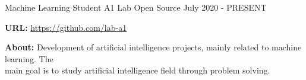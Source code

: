 
\begin{cventries}

	\cventry
	{Machine Learning Student} %
	{A1 Lab} %
	{Open Source} %
	{July 2020 - PRESENT} %
	{
		\begin{cvitems} %
			\item {\textbf{URL:} \href{https://github.com/dl4all}{https://github.com/lab-a1}}
			\item {\textbf{About:} Development of artificial intelligence projects, mainly related to machine learning. The\\main goal is to study artificial intelligence field through problem solving.}
		\end{cvitems}
	}
\end{cventries}
